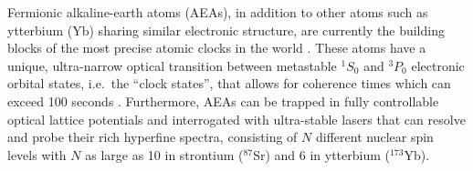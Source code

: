 \documentclass[preprint,showkeys,nofootinbib]{revtex4-1}
\newcommand{\1}{\mathds{1}}
\newcommand{\note}[1]{\textcolor{red}{#1}}
\begin{document}

Fermionic alkaline-earth atoms (AEAs), in addition to other atoms such
as ytterbium (Yb) sharing similar electronic structure, are currently
the building blocks of the most precise atomic clocks in the world
\cite{derevianko2011colloquium, katori2011optical, ludlow2015optical}.
These atoms have a unique, ultra-narrow optical transition between
metastable ${}^1S_0$ and ${}^3P_0$ electronic orbital states, i.e.~the
``clock states'', that allows for coherence times which can exceed 100
seconds \cite{porsev2004hyperfine, santra2004properties}.
Furthermore, AEAs can be trapped in fully controllable optical lattice
potentials and interrogated with ultra-stable lasers that can resolve
and probe their rich hyperfine spectra, consisting of $N$ different
nuclear spin levels with $N$ as large as 10 in strontium (${}^{87}$Sr)
and 6 in ytterbium (${}^{173}$Yb).
\end{document}
